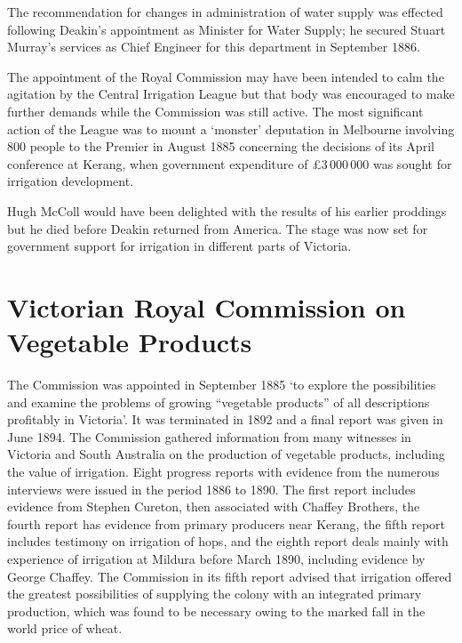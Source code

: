 The recommendation for changes in administration of water supply was
effected following Deakin's appointment as Minister for Water Supply;
he secured Stuart Murray's services as Chief Engineer for this
department in September 1886.

The appointment of the Royal Commission may have been intended to calm
the agitation by the Central Irrigation League but that body was
encouraged to make further demands while the Commission was still
active.  The most significant action of the League was to mount a
`monster' deputation in Melbourne involving 800 people to the Premier
in August 1885 concerning the decisions of its April conference at
Kerang, when government expenditure of \pounds3\,000\,000 was sought
for irrigation development.\fn{Australasian, Aug.\ 1885, p.\,253.}

Hugh McColl would have been delighted with the results of his earlier
proddings but he died before Deakin returned from America.  The stage
was now set for government support for irrigation in different parts
of Victoria.

\section*{Victorian Royal Commission on Vegetable Products}

The Commission was appointed in September 1885 `to explore the
possibilities and examine the problems of growing ``vegetable
products'' of all descriptions profitably in Victoria'.  It was
terminated in 1892 and a final report was given in June
1894.  The
Commission gathered information from many witnesses in Victoria and
South Australia on the production of vegetable products, including the
value of irrigation.  Eight progress reports with evidence from the
numerous interviews were issued in the period 1886 to 1890.  The first
report includes evidence from Stephen Cureton, then associated with
Chaffey Brothers, the fourth report has evidence from primary
producers near Kerang, the fifth report includes testimony on
irrigation of hops, and the eighth report deals mainly with experience
of irrigation at Mildura before March 1890, including evidence by
George Chaffey.  The Commission in its fifth report advised that
irrigation offered the greatest possibilities of supplying the colony
with an integrated primary production, which was found to be necessary
owing to the marked fall in the world price of
wheat.


